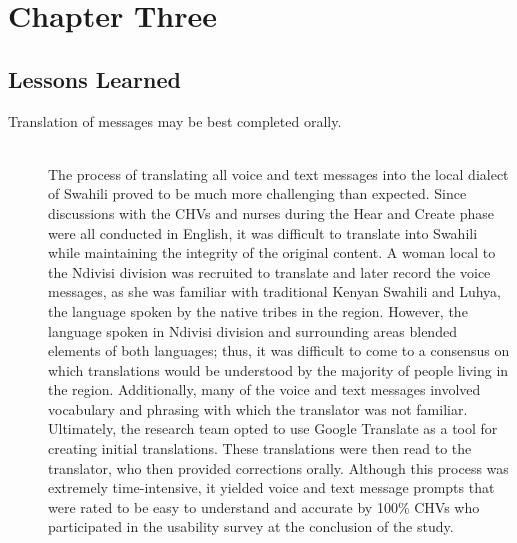 \chapter{Chapter Three}


\section{Lessons Learned}
\begin{description}
	\item[Translation of messages may be best completed orally.] \hfill \\
	The process of translating all voice and text messages into the local dialect of Swahili proved to be much more challenging than expected. Since discussions with the CHVs and nurses during the Hear and Create phase were all conducted in English, it was difficult to translate into Swahili while maintaining the integrity of the original content. A woman local to the Ndivisi division was recruited to translate and later record the voice messages, as she was familiar with traditional Kenyan Swahili and Luhya, the language spoken by the native tribes in the region. However, the language spoken in Ndivisi division and surrounding areas blended elements of both languages; thus, it was difficult to come to a consensus on which translations would be understood by the majority of people living in the region. Additionally, many of the voice and text messages involved vocabulary and phrasing with which the translator was not familiar. Ultimately, the research team opted to use Google Translate as a tool for creating initial translations. These translations were then read to the translator, who then provided corrections orally. Although this process was extremely time-intensive, it yielded voice and text message prompts that were rated to be easy to understand and accurate by 100\% CHVs who participated in the usability survey at the conclusion of the study. 


\end{description}
